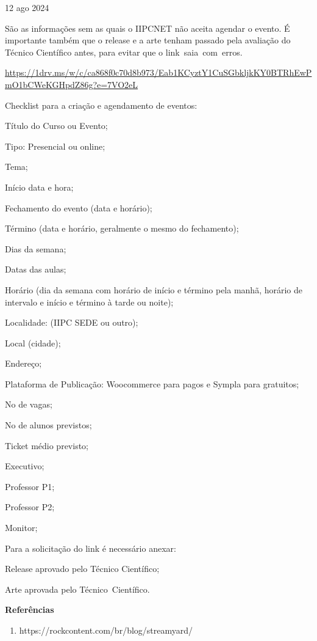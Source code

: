 \documentclass[
]{book}
\providecommand{\tightlist}{%
  \setlength{\itemsep}{0pt}\setlength{\parskip}{0pt}}
\begin{document}
12 ago 2024

São as informações sem as quais o IIPCNET não aceita agendar o evento. É
importante também que o release e a arte tenham passado pela avaliação
do Técnico Científico antes, para evitar que o link~saia~com~erros.

\url{https://1drv.ms/w/c/ca868f0c70d8b973/Eab1KCyztY1CuSGbkljkKY0BTRhEwPmO1bCWeKGHpdZ86g?e=7VO2eL}

Checklist para a criação e agendamento de eventos:

Título do Curso ou Evento;

Tipo: Presencial ou online;

Tema;

Início data e hora;

Fechamento do evento (data e horário);

Término (data e horário, geralmente o mesmo do fechamento);

Dias da semana;

Datas das aulas;

Horário (dia da semana com horário de início e término pela manhã,
horário de intervalo e início e término à tarde ou noite);

Localidade: (IIPC SEDE ou outro);

Local (cidade);

Endereço;

Plataforma de Publicação: Woocommerce para pagos e Sympla para
gratuitos;

No de vagas;

No de alunos previstos;

Ticket médio previsto;

Executivo;

Professor P1;

Professor P2;

Monitor;

Para a solicitação do link é necessário anexar:

Release aprovado pelo Técnico Científico;

Arte aprovada pelo Técnico~Científico.

\textbf{Referências}

\begin{enumerate}
\def\labelenumi{(\arabic{enumi})}
\tightlist
\item
  https://rockcontent.com/br/blog/streamyard/
\end{enumerate}

\backmatter
\end{document}
